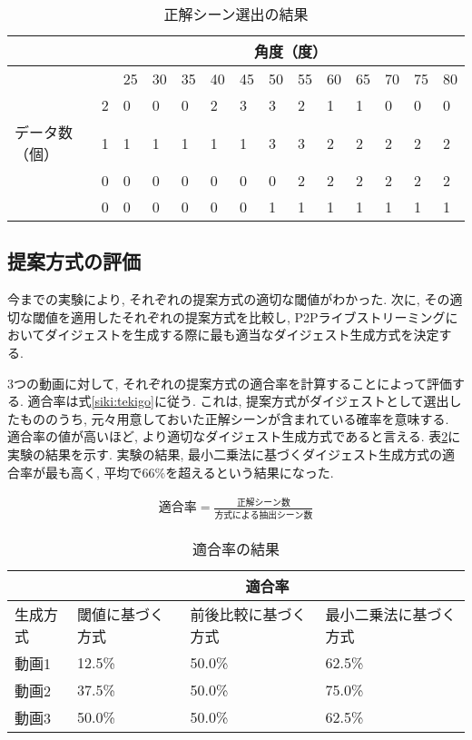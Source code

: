 \begin{table}[h]
  \caption{正解シーン選出の結果}
  \label{tbl:digest3-1}
  \centering
      {\small
        \begin{tabular}{|l|l||l|l|l|l|l|l|l|l|l|l|l|l|} \hline
          & & \multicolumn{12}{|c|}{角度（度）} \\ \hline
          & & 25 & 30 & 35 & 40 & 45 & 50 & 55 & 60 & 65 & 70 & 75 & 80 \\ \hline \hline
          & 2 & 0 & 0 & 0 & 2 & 3 & 3 & 2 & 1 & 1 & 0 & 0 & 0 \\ \cline{2-14}
          データ数（個） & 1 & 1 & 1 & 1 & 1 & 1 & 3 & 3 & 2 & 2 & 2 & 2 & 2 \\ \cline{2-14}
          & 0 & 0 & 0 & 0 & 0 & 0 & 0 & 2 & 2 & 2 & 2 & 2 & 2 \\ \cline{2-14}
          & 0 & 0 & 0 & 0 & 0 & 0 & 1 & 1 & 1 & 1 & 1 & 1 & 1 \\ \cline{2-14}
          \hline
        \end{tabular}
      }
\end{table}

\subsection{提案方式の評価}\label{subsec: eval-digest}
今までの実験により, それぞれの提案方式の適切な閾値がわかった. 次に, その適切な閾値を適用したそれぞれの提案方式を比較し, P2Pライブストリーミングにおいてダイジェストを生成する際に最も適当なダイジェスト生成方式を決定する.

3つの動画に対して, それぞれの提案方式の適合率を計算することによって評価する. 適合率は式\ref{siki:tekigo}に従う. これは, 提案方式がダイジェストとして選出したもののうち, 元々用意しておいた正解シーンが含まれている確率を意味する. 適合率の値が高いほど, より適切なダイジェスト生成方式であると言える. 表\ref{tbl:tekigo}に実験の結果を示す. 実験の結果, 最小二乗法に基づくダイジェスト生成方式の適合率が最も高く, 平均で66\%を超えるという結果になった.

\begin{eqnarray}
  適合率 = \frac{正解シーン数}{方式による抽出シーン数}
  \label{siki:tekigo}
\end{eqnarray}

\begin{table}[h]
  \caption{適合率の結果}
  \label{tbl:tekigo}
  \centering
      {\small
        \begin{tabular}{|l|l|l|l|} \hline
          & \multicolumn{3}{|c|}{適合率} \\ \hline
          生成方式 & 閾値に基づく方式 & 前後比較に基づく方式 & 最小二乗法に基づく方式 \\ \hline
          動画1 & 12.5\% & 50.0\% & 62.5\% \\ \hline
          動画2 & 37.5\% & 50.0\% & 75.0\% \\ \hline
          動画3 & 50.0\% & 50.0\% & 62.5\% \\ \hline
        \end{tabular}
      }
\end{table}

